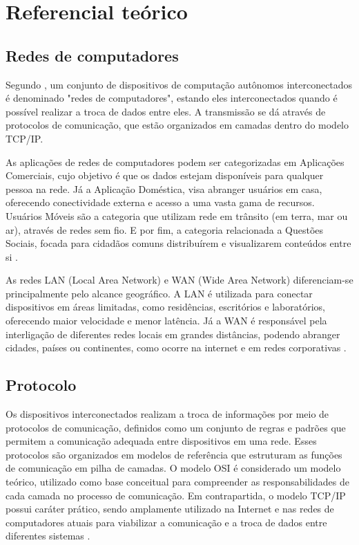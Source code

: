 \documentclass[
    12pt,                %
    openright,           %
    oneside,             %
    a4paper,             %
    english,             %
    brazil               %
]{abntex2}
\begin{document}
\section{Referencial teórico}
\label{sec:referencial}

\subsection{Redes de computadores}

Segundo , um conjunto de dispositivos de computação autônomos interconectados é denominado "redes de computadores", estando eles interconectados quando é possível realizar a troca de dados entre eles. A transmissão se dá através de protocolos de comunicação, que estão organizados em camadas dentro do modelo
TCP/IP.


As aplicações de redes de computadores podem ser categorizadas em Aplicações Comerciais, cujo objetivo é que os dados estejam disponíveis para qualquer pessoa na rede. Já a Aplicação Doméstica, visa abranger usuários em casa, oferecendo conectividade externa e acesso a uma vasta gama de recursos. Usuários Móveis são a categoria que utilizam rede em trânsito (em terra, mar ou ar), através de redes sem fio. E por fim, a categoria relacionada a Questões Sociais, focada para cidadãos comuns distribuírem e visualizarem conteúdos entre si \cite{Tanenbaum2011}.


As redes LAN (Local Area Network) e WAN (Wide Area Network) diferenciam-se principalmente pelo alcance geográfico. A LAN é utilizada para conectar dispositivos em áreas limitadas, como residências, escritórios e laboratórios, oferecendo maior velocidade e menor latência. Já a WAN é responsável pela interligação de diferentes redes locais em grandes distâncias, podendo abranger cidades, países ou continentes, como ocorre na internet e em redes corporativas \cite{Tanenbaum2011}.

\subsection{Protocolo}

Os dispositivos interconectados realizam a troca de informações por meio de protocolos de comunicação, definidos como um conjunto de regras e padrões que permitem a comunicação adequada entre dispositivos em uma rede. Esses protocolos são organizados em modelos de referência que estruturam as funções de comunicação em pilha de camadas. O modelo OSI é considerado um modelo teórico, utilizado como base conceitual para compreender as responsabilidades de cada camada no processo de comunicação. Em contrapartida, o modelo TCP/IP possui caráter prático, sendo amplamente utilizado na Internet e nas redes de computadores atuais para viabilizar a comunicação e a troca de dados entre diferentes sistemas \cite{Tanenbaum2011}.
\end{document}
